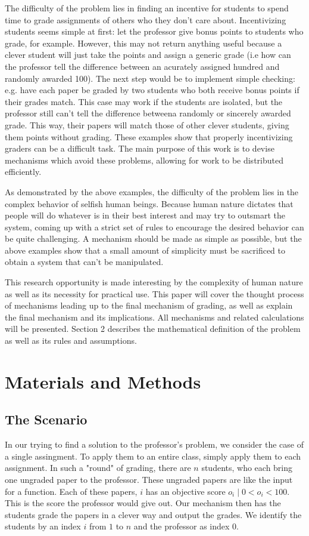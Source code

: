 \documentclass[12pt, Arial]{article}
\begin{document}
The difficulty of the problem lies in finding an incentive for students to spend time to grade assignments of others who they don't care about. Incentivizing students seems simple at first: let the professor give bonus points to students who grade, for example. However, this may not return anything useful because a clever student will just take the points and assign a generic grade (i.e how can the professor tell the difference between an acurately assigned hundred and randomly awarded 100). The next step would be to implement simple checking: e.g. have each paper be graded by two students who both receive bonus points if their grades match. This case may work if the students are isolated, but the professor still can't tell the difference betweena randomly or sincerely awarded grade. This way, their papers will match those of other clever students, giving them points without grading. These examples show that properly incentivizing graders can be a difficult task. The main purpose of this work is to devise mechanisms which avoid these problems, allowing for work to be distributed efficiently.

As demonstrated by the above examples, the difficulty of the problem lies in the complex behavior of selfish human beings. Because human nature dictates that people will do whatever is in their best interest and may try to outsmart the system, coming up with a strict set of rules to encourage the desired behavior can be quite challenging. A mechanism should be made as simple as possible, but the above examples show that a small amount of simplicity must be sacrificed to obtain a system that can't be manipulated.

This research opportunity is made interesting by the complexity of human nature as well as its necessity for practical use. This paper will cover the thought process of mechanisms leading up to the final mechanism of grading, as well as explain the final mechanism and its implications. All mechanisms and related calculations will be presented. Section 2 describes the mathematical definition of the problem as well as its rules and assumptions.

\section{Materials and Methods}
\subsection{The Scenario}
In our trying to find a solution to the professor's problem, we consider the case of a single assingment. To apply them to an entire class, simply apply them to each assignment. In such a "round" of grading, there are $n$ students, who each bring one ungraded paper to the professor. These ungraded papers are like the input for a function. Each of these papers, $i$ has an objective score $o_i\mid 0<o_i<100$. This is the score the professor would give out. Our mechanism then has the students grade the papers in a clever way and output the grades. We identify the students by an index $i$ from $1$ to $n$ and the professor as index $0$.
\end{document}
